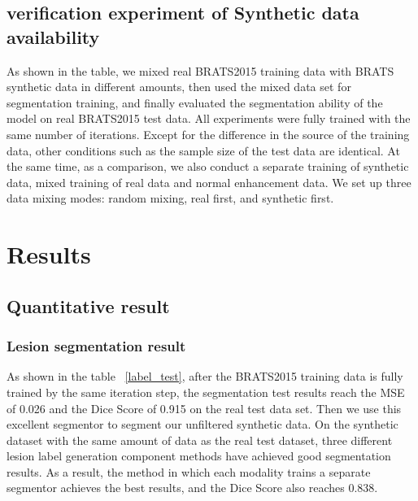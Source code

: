 \documentclass[letterpaper]{article} %
\begin{document}
\subsection{verification experiment of Synthetic data availability}
As shown in the table, we mixed real BRATS2015 training data with BRATS synthetic data in different amounts, then used the mixed data set for segmentation training, and finally evaluated the segmentation ability of the model on real BRATS2015 test data. All experiments were fully trained with the same number of iterations. Except for the difference in the source of the training data, other conditions such as the sample size of the test data are identical. At the same time, as a comparison, we also conduct a separate training of synthetic data, mixed training of real data and normal enhancement data. We set up three data mixing modes: random mixing, real first, and synthetic
first.

\section{Results}
\subsection{Quantitative result}

\subsubsection{Lesion segmentation result}
\begin{table}[t]
	\caption{Lesion segmentation result}\smallskip
	\centering
	\label{label_test}	
\end{table}

As shown in the table ~\ref{label_test}, after the BRATS2015 training data is fully trained by the same iteration step, the segmentation test results reach the MSE of 0.026 and the Dice Score of 0.915 on the real test data set. Then we use this excellent segmentor to segment our unfiltered synthetic data. On the synthetic dataset with the same amount of data as the real test dataset, three different lesion label generation component methods have achieved good segmentation results. As a result, the method in which each modality trains a separate segmentor achieves the best results, and the Dice Score also reaches 0.838.
\end{document}
